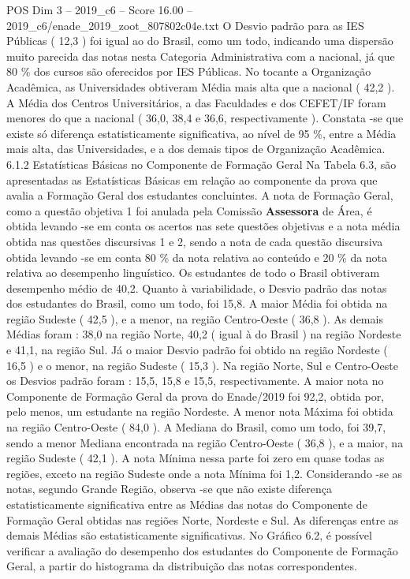 \begin{textsample}{POS Dim 3 – 2019\_c6 – Score 16.00 – 2019\_c6/enade\_2019\_zoot\_807802c04e.txt}
O Desvio padrão para as IES Públicas ( 12,3 ) foi igual ao do Brasil, como um todo, indicando uma dispersão muito parecida das notas nesta Categoria Administrativa com a nacional, já que 80 \% dos cursos são oferecidos por IES Públicas.
No tocante a Organização Acadêmica, as Universidades obtiveram Média mais alta que a nacional ( 42,2 ).
A Média dos Centros Universitários, a das Faculdades e dos CEFET/IF foram menores do que a nacional ( 36,0, 38,4 e 36,6, respectivamente ).
Constata -se que existe só diferença estatisticamente significativa, ao nível de 95 \%, entre a Média mais alta, das Universidades, e a dos demais tipos de Organização Acadêmica. 6.1.2 Estatísticas Básicas no Componente de Formação Geral Na Tabela 6.3, são apresentadas as Estatísticas Básicas em relação ao componente da prova que avalia a Formação Geral dos estudantes concluintes.
A nota de Formação Geral, como a questão objetiva 1 foi anulada pela Comissão \textbf{Assessora} de Área, é obtida levando -se em conta os acertos nas sete questões objetivas e a nota média obtida nas questões discursivas 1 e 2, sendo a nota de cada questão discursiva obtida levando -se em conta 80 \% da nota relativa ao conteúdo e 20 \% da nota relativa ao desempenho linguístico.
Os estudantes de todo o Brasil obtiveram desempenho médio de 40,2.
Quanto à variabilidade, o Desvio padrão das notas dos estudantes do Brasil, como um todo, foi 15,8.
A maior Média foi obtida na região Sudeste ( 42,5 ), e a menor, na região Centro-Oeste ( 36,8 ).
As demais Médias foram : 38,0 na região Norte, 40,2 ( igual à do Brasil ) na região Nordeste e 41,1, na região Sul.
Já o maior Desvio padrão foi obtido na região Nordeste ( 16,5 ) e o menor, na região Sudeste ( 15,3 ).
Na região Norte, Sul e Centro-Oeste os Desvios padrão foram : 15,5, 15,8 e 15,5, respectivamente.
A maior nota no Componente de Formação Geral da prova do Enade/2019 foi 92,2, obtida por, pelo menos, um estudante na região Nordeste.
A menor nota Máxima foi obtida na região Centro-Oeste ( 84,0 ).
A Mediana do Brasil, como um todo, foi 39,7, sendo a menor Mediana encontrada na região Centro-Oeste ( 36,8 ), e a maior, na região Sudeste ( 42,1 ).
A nota Mínima nessa parte foi zero em quase todas as regiões, exceto na região Sudeste onde a nota Mínima foi 1,2.
Considerando -se as notas, segundo Grande Região, observa -se que não existe diferença estatisticamente significativa entre as Médias das notas do Componente de Formação Geral obtidas nas regiões Norte, Nordeste e Sul.
As diferenças entre as demais Médias são estatisticamente significativas.
No Gráfico 6.2, é possível verificar a avaliação do desempenho dos estudantes do Componente de Formação Geral, a partir do histograma da distribuição das notas correspondentes.

\end{textsample}
